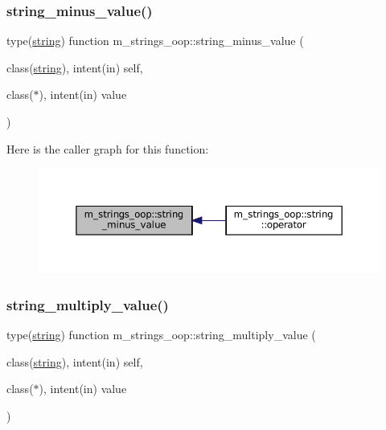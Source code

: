 \subsubsection{\texorpdfstring{string\+\_\+minus\+\_\+value()}{string\_minus\_value()}}
{\footnotesize\ttfamily type(\mbox{\hyperlink{structm__strings__oop_1_1string}{string}}) function m\+\_\+strings\+\_\+oop\+::string\+\_\+minus\+\_\+value (\begin{DoxyParamCaption}\item[{class(\mbox{\hyperlink{structm__strings__oop_1_1string}{string}}), intent(in)}]{self,  }\item[{class($\ast$), intent(in)}]{value }\end{DoxyParamCaption})\hspace{0.3cm}{\ttfamily [private]}}

Here is the caller graph for this function\+:\nopagebreak
\begin{figure}[H]
\begin{center}
\leavevmode
\includegraphics[width=350pt]{namespacem__strings__oop_a0ec84db43ac789bfc02f46f933a3fc9f_icgraph}
\end{center}
\end{figure}
\mbox{\label{namespacem__strings__oop_a9624f1e09be383f993e7c0e94b230deb}} 
\subsubsection{\texorpdfstring{string\+\_\+multiply\+\_\+value()}{string\_multiply\_value()}}
{\footnotesize\ttfamily type(\mbox{\hyperlink{structm__strings__oop_1_1string}{string}}) function m\+\_\+strings\+\_\+oop\+::string\+\_\+multiply\+\_\+value (\begin{DoxyParamCaption}\item[{class(\mbox{\hyperlink{structm__strings__oop_1_1string}{string}}), intent(in)}]{self,  }\item[{class($\ast$), intent(in)}]{value }\end{DoxyParamCaption})\hspace{0.3cm}{\ttfamily [private]}}

